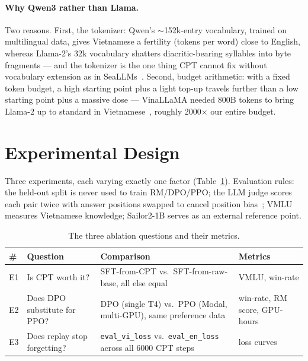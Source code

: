 \documentclass[10pt,twocolumn]{article}
\begin{document}
\paragraph{Why Qwen3 rather than Llama.}
Two reasons. First, the tokenizer: Qwen's $\sim$152k-entry vocabulary, trained on multilingual data, gives Vietnamese a fertility (tokens per word) close to English, whereas Llama-2's 32k vocabulary shatters diacritic-bearing syllables into byte fragments --- and the tokenizer is the one thing CPT cannot fix without vocabulary extension as in SeaLLMs~\citep{nguyen2023seallms}. Second, budget arithmetic: with a fixed token budget, a high starting point plus a light top-up travels further than a low starting point plus a massive dose --- VinaLLaMA needed 800B tokens to bring Llama-2 up to standard in Vietnamese~\citep{nguyen2023vinallama}, roughly 2000$\times$ our entire budget.

\section{Experimental Design}
\label{sec:experiments}

Three experiments, each varying exactly one factor (Table~\ref{tab:ablations}). Evaluation rules: the held-out split is never used to train RM/DPO/PPO; the LLM judge scores each pair twice with answer positions swapped to cancel position bias~\citep{zheng2023judge}; VMLU~\citep{vmlu2025} measures Vietnamese knowledge; Sailor2-1B serves as an external reference point.

\begin{table}[t]
\centering\small
\caption{The three ablation questions and their metrics.}
\label{tab:ablations}
\begin{tabularx}{\textwidth}{@{}lXXl@{}}
\toprule
\# & \textbf{Question} & \textbf{Comparison} & \textbf{Metrics} \\
\midrule
E1 & Is CPT worth it? & SFT-from-CPT vs.\ SFT-from-raw-base, all else equal & VMLU, win-rate \\
E2 & Does DPO substitute for PPO? & DPO (single T4) vs.\ PPO (Modal, multi-GPU), same preference data & win-rate, RM score, GPU-hours \\
E3 & Does replay stop forgetting? & \texttt{eval\_vi\_loss} vs.\ \texttt{eval\_en\_loss} across all 6000 CPT steps & loss curves \\
\bottomrule
\end{tabularx}
\end{table}
\end{document}
